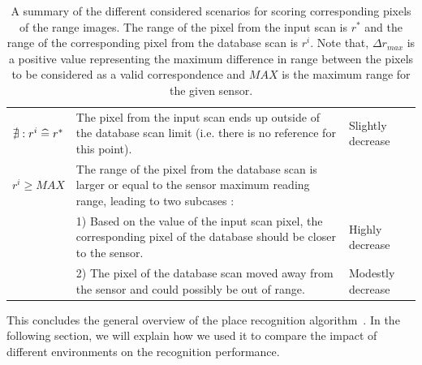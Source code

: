 \begin{table}[H]
\begin{tabular}{@{}p{}p{}p{}@{}}
        $\nexists : r^i \mathrel{\widehat{=}} r^*$ & The pixel from the input scan ends up outside of the database scan limit (i.e. there is no reference for this point).   & Slightly decrease \\
        $r^i \ge MAX$                    & The range of the pixel from the database scan is larger or equal to the sensor maximum reading range, leading to two subcases : & \\
                                         & 1) Based on the value of the input scan pixel, the corresponding pixel of the database should be closer to the sensor.  & Highly decrease \\
                                         & 2) The pixel of the database scan moved away from the sensor and could possibly be out of range.                        & Modestly decrease \\
        \bottomrule
    \end{tabular}
    \caption[A summary of the different scenarios for scoring corresponding pixels of the range images.]{A summary of the different considered scenarios for scoring corresponding pixels of the range images. The range of the pixel from the input scan is $r^*$ and the range of the corresponding pixel from the database scan is $r^i$. Note that, $\Delta r_{max}$ is a positive value representing the maximum difference in range between the pixels to be considered as a valid correspondence and $MAX$ is the maximum range for the given sensor.}
    \label{tab:chap_slam_scoring_scenarios}
\end{table}

This concludes the general overview of the place recognition algorithm~\citep{Steder2011b}. In the following section, we will explain how we used it to compare the impact of different environments on the recognition performance.

